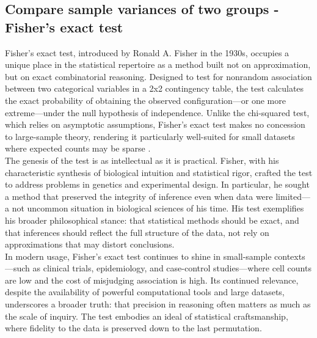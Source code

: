 \documentclass{book}
\begin{document}
\newpage

\subsection{Compare sample variances of two groups - Fisher's exact test}

Fisher’s exact test, introduced by Ronald A. Fisher in the 1930s, occupies a unique place in the statistical repertoire as a method built not on approximation, but on exact combinatorial reasoning. Designed to test for nonrandom association between two categorical variables in a 2x2 contingency table, the test calculates the exact probability of obtaining the observed configuration—or one more extreme—under the null hypothesis of independence. Unlike the chi-squared test, which relies on asymptotic assumptions, Fisher’s exact test makes no concession to large-sample theory, rendering it particularly well-suited for small datasets where expected counts may be sparse \cite{welch1947}.\\

The genesis of the test is as intellectual as it is practical. Fisher, with his characteristic synthesis of biological intuition and statistical rigor, crafted the test to address problems in genetics and experimental design. In particular, he sought a method that preserved the integrity of inference even when data were limited—a not uncommon situation in biological sciences of his time. His test exemplifies his broader philosophical stance: that statistical methods should be exact, and that inferences should reflect the full structure of the data, not rely on approximations that may distort conclusions.\\

In modern usage, Fisher’s exact test continues to shine in small-sample contexts—such as clinical trials, epidemiology, and case-control studies—where cell counts are low and the cost of misjudging association is high. Its continued relevance, despite the availability of powerful computational tools and large datasets, underscores a broader truth: that precision in reasoning often matters as much as the scale of inquiry. The test embodies an ideal of statistical craftsmanship, where fidelity to the data is preserved down to the last permutation.\\
\end{document}
